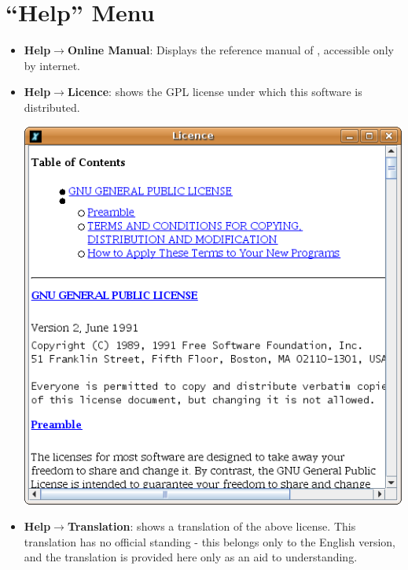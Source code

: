 \section{``Help'' Menu}
\begin{itemize}
\item \textbf{Help$\to$Online Manual}: Displays the reference manual of \xlogo, accessible only by internet. 
	\vspace{0.25cm}
\item \textbf{Help$\to$Licence}: shows the GPL license under which this software is distributed.
	\begin{center}
 		\includegraphics[scale=0.4]{pics/interface-CaptureLicence.png}
	\end{center}
	\vspace{0.25cm}
\item \textbf{Help$\to$Translation}: shows a translation of the above license. This translation has no official standing - this belongs only to the English version, and the translation is provided here only as an aid to understanding.


\end{itemize}
